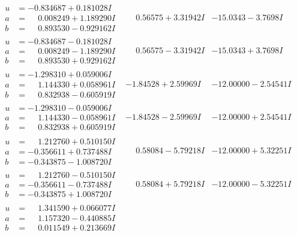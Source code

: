 \documentclass[1p]{elsarticle_modified}
\theoremstyle{definition}
\begin{document}
$$\begin{array}{c|c|c}
\begin{aligned}
u &= -0.834687 + 0.181028 I \\
a &= \phantom{-}0.008249 + 1.189290 I \\
b &= \phantom{-}0.893530 - 0.929162 I\end{aligned}
 & \phantom{-}0.56575 + 3.31942 I & -15.0343 - 3.7698 I \\ \hline\begin{aligned}
u &= -0.834687 - 0.181028 I \\
a &= \phantom{-}0.008249 - 1.189290 I \\
b &= \phantom{-}0.893530 + 0.929162 I\end{aligned}
 & \phantom{-}0.56575 - 3.31942 I & -15.0343 + 3.7698 I \\ \hline\begin{aligned}
u &= -1.298310 + 0.059006 I \\
a &= \phantom{-}1.144330 + 0.058961 I \\
b &= \phantom{-}0.832938 - 0.605919 I\end{aligned}
 & -1.84528 + 2.59969 I & -12.00000 - 2.54541 I \\ \hline\begin{aligned}
u &= -1.298310 - 0.059006 I \\
a &= \phantom{-}1.144330 - 0.058961 I \\
b &= \phantom{-}0.832938 + 0.605919 I\end{aligned}
 & -1.84528 - 2.59969 I & -12.00000 + 2.54541 I \\ \hline\begin{aligned}
u &= \phantom{-}1.212760 + 0.510150 I \\
a &= -0.356611 + 0.737488 I \\
b &= -0.343875 - 1.008720 I\end{aligned}
 & \phantom{-}0.58084 - 5.79218 I & -12.00000 + 5.32251 I \\ \hline\begin{aligned}
u &= \phantom{-}1.212760 - 0.510150 I \\
a &= -0.356611 - 0.737488 I \\
b &= -0.343875 + 1.008720 I\end{aligned}
 & \phantom{-}0.58084 + 5.79218 I & -12.00000 - 5.32251 I \\ \hline\begin{aligned}
u &= \phantom{-}1.341590 + 0.066077 I \\
a &= \phantom{-}1.157320 - 0.440885 I \\
b &= \phantom{-}0.011549 + 0.213669 I\end{aligned}

\end{array}$$
\end{document}
